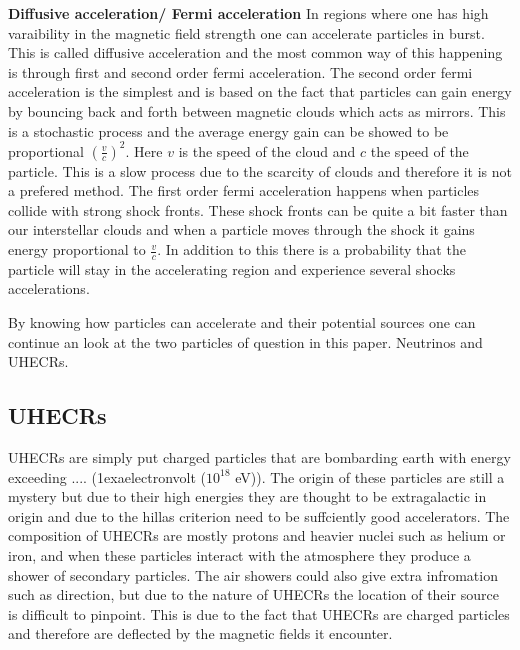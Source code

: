 \documentclass{article}
\begin{document}
\textbf{Diffusive acceleration/ Fermi acceleration}
In regions where one has high varaibility in the magnetic field strength one can accelerate particles in burst. 
This is called diffusive acceleration and the most common way of this happening is through first and second order fermi acceleration.
The second order fermi acceleration is the simplest and is based on the fact that particles can gain energy by bouncing back and forth between magnetic clouds which acts as mirrors. 
This is a stochastic process and the average energy gain can be showed to be proportional $(\frac{v}{c})^2$. Here $v$ is the speed of the cloud 
and $c$ the speed of the particle. This is a slow process due to the scarcity of clouds and therefore it is not a prefered method.
The first order fermi acceleration happens when particles collide with strong shock fronts. These shock fronts can be quite a bit faster than our interstellar clouds
and when a particle moves through the shock it gains energy proportional to $\frac{v}{c}$. In addition to this there is a probability that the particle will stay in the accelerating region and 
experience several shocks accelerations. 

By knowing how particles can accelerate and their potential sources one can continue an look at the two particles of question in this paper. 
Neutrinos and UHECRs.
\subsection{UHECRs}

UHECRs are simply put charged particles that are bombarding earth with energy exceeding .... (1exaelectronvolt ($10^{18}$ eV)). The origin of 
these particles are still a mystery but  due to their high energies they are thought to be extragalactic in origin and due to the hillas criterion need to be suffciently good accelerators.
The composition of UHECRs are mostly protons and heavier nuclei such as helium or iron, and when these particles interact with the atmosphere they produce a shower of secondary particles.
The air showers could also give extra infromation such as direction, but due to the nature of UHECRs the location of their source is
difficult to pinpoint. This is due to the fact that UHECRs are charged particles and therefore are deflected by the magnetic fields it encounter.
\end{document}
